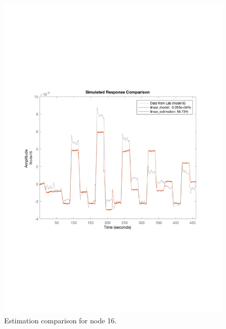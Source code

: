 \begin{figure}[!tbp]
\begin{minipage}[b]{0.45\textwidth}
    \includegraphics[width=\textwidth]{report/pictures/Node16_estimation.pdf}
    \caption{Estimation comparison for node 16.}
  \end{minipage}
\end{figure}

